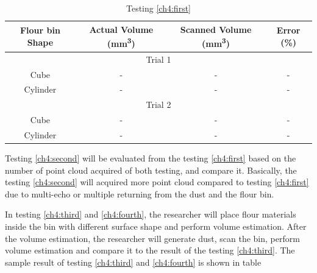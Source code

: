 \begin{table}[H]
	\caption{Testing \ref{ch4:first}}
	\label{ch4:tab:Testing 1}
	\centering
	\begin{tabular}{|c|c|c|c|}
		\hline
		Flour bin Shape & Actual Volume (\si{mm^3}) & Scanned Volume (\si{mm^3}) & Error (\%) \\
		\hline
		\multicolumn{4}{|c|}{Trial 1}                                                         \\
		\hline
		Cube            & -                         & -                          & -          \\
		\hline
		Cylinder        & -                         & -                          & -          \\
		\hline
		\multicolumn{4}{|c|}{Trial 2}                                                         \\
		\hline
		Cube            & -                         & -                          & -          \\
		\hline
		Cylinder        & -                         & -                          & -          \\
		\hline
	\end{tabular}
\end{table}

Testing \ref{ch4:second} will be evaluated from the testing \ref{ch4:first} based on the number of point cloud acquired of both testing, and compare it. Basically, the testing \ref{ch4:second} will acquired more point cloud compared to testing \ref{ch4:first} due to multi-echo or multiple returning from the dust and the flour bin.

In testing \ref{ch4:third} and \ref{ch4:fourth}, the researcher will place flour materials inside the bin with different surface shape and perform volume estimation. After the volume estimation, the researcher will generate dust, scan the bin, perform volume estimation and compare it to the result of the testing \ref{ch4:third}. The sample result of testing \ref{ch4:third} and \ref{ch4:fourth} is shown in table

